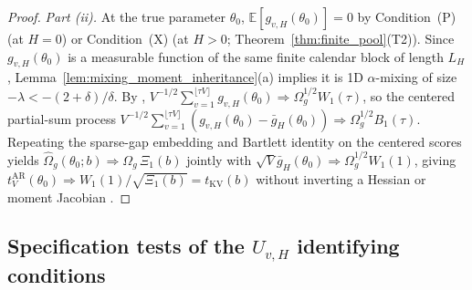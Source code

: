 \begin{proof}
\emph{Part (ii).} At the true parameter $\theta_0$, $\mathbb{E}[g_{v,H}(\theta_0)] = 0$ by Condition~(P) (at $H=0$) or Condition~(X) (at $H>0$; Theorem~\ref{thm:finite_pool}(T2)). Since $g_{v,H}(\theta_0)$ is a measurable function of the same finite calendar block of length $L_H$, Lemma~\ref{lem:mixing_moment_inheritance}(a) implies it is 1D $\alpha$-mixing of size $-\lambda < -(2+\delta)/\delta$. By \citet[Theorem~2.11]{WW88}, $V^{-1/2}\sum_{v=1}^{\lfloor \tau V \rfloor} g_{v,H}(\theta_0) \Rightarrow \Omega_g^{1/2} W_1(\tau)$, so the centered partial-sum process $V^{-1/2}\sum_{v=1}^{\lfloor \tau V \rfloor}(g_{v,H}(\theta_0) - \bar{g}_H(\theta_0)) \Rightarrow \Omega_g^{1/2} B_1(\tau)$. Repeating the sparse-gap embedding and \citet[Theorem~1]{KV05} Bartlett identity on the centered scores yields $\hat\Omega_g(\theta_0; b) \Rightarrow \Omega_g\,\Xi_1(b)$ jointly with $\sqrt{V}\bar{g}_H(\theta_0) \Rightarrow \Omega_g^{1/2} W_1(1)$, giving $t_V^{\mathrm{AR}}(\theta_0) \Rightarrow W_1(1)/\sqrt{\Xi_1(b)} = t_{\mathrm{KV}}(b)$ without inverting a Hessian or moment Jacobian \citep{AR49,SW00}.
\end{proof}

\subsection{Specification tests of the $U_{v,H}$ identifying conditions}
\label{sec:spec_tests_app}

